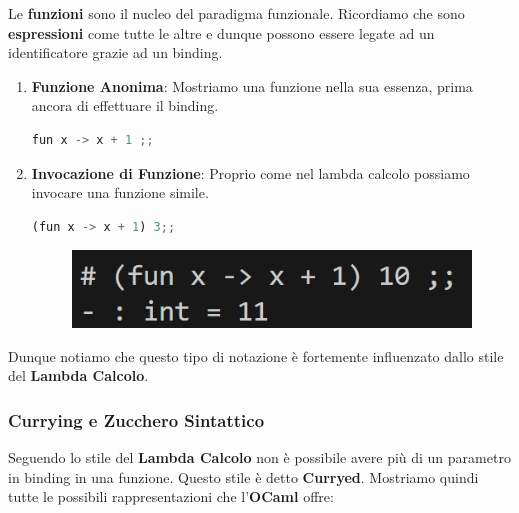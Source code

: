 \documentclass{article}
\begin{document}
Le \textbf{funzioni} sono il nucleo del paradigma funzionale. Ricordiamo che sono \textbf{espressioni} come tutte le altre e dunque possono essere legate ad un identificatore grazie ad un binding.

\begin{enumerate}
    \item \textbf{Funzione Anonima}: Mostriamo una funzione nella sua essenza, prima ancora di effettuare il binding.
    \vspace*{10px}
    \begin{lstlisting}[language = JavaScript]
    fun x -> x + 1 ;;
    \end{lstlisting}
    \vspace*{-10px}
    \item \textbf{Invocazione di Funzione}: Proprio come nel lambda calcolo possiamo invocare una funzione simile.
    \vspace*{10px}
    \begin{lstlisting}[language = JavaScript]
    (fun x -> x + 1) 3;;
    \end{lstlisting}
    \begin{figure}[htbp]
    \center
    \includegraphics[scale=0.35]{img/invocazioneFunzione.png}
    \end{figure}
    \vspace*{-10px}
\end{enumerate}

\vspace{15px}

Dunque notiamo che questo tipo di notazione è fortemente influenzato dallo stile del \textbf{Lambda Calcolo}.

\newpage

\subsubsection{Currying e Zucchero Sintattico}

Seguendo lo stile del \textbf{Lambda Calcolo} non è possibile avere più di un parametro in binding in una funzione. Questo stile è detto \textbf{Curryed}. Mostriamo quindi tutte le possibili rappresentazioni che l'\textbf{OCaml} offre:
\end{document}
